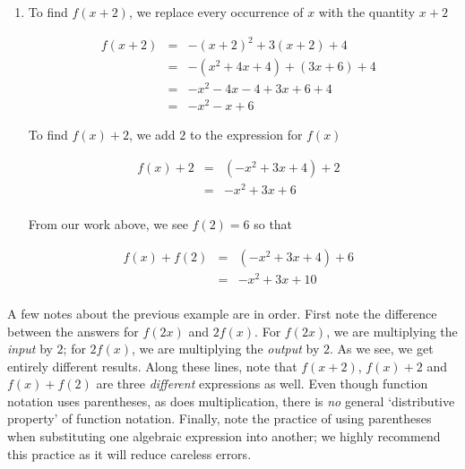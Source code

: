 \begin{solution}
\begin{enumerate}
			
			\item  To find $f(x+2)$, we replace every occurrence of $x$ with the quantity $x+2$
			
			\[ \begin{array}{rclr}  
			f(x+2) & = & -(x+2)^2 + 3(x+2) + 4 & \\
			& = & -\left(x^2 + 4x + 4\right) + (3x+6) + 4 & \\
			& = & -x^2-4x-4+3x+6+4 &  \\
			& = & -x^2-x+6 & 
			\end{array} \]
			
			To find $f(x)+2$, we add $2$ to the expression for $f(x)$
			
			\[ \begin{array}{rclr}  
			f(x) + 2 & = & \left(-x^2 + 3x + 4\right) + 2  & \\
			& = & -x^2 + 3x + 6 \\ 
			\end{array} \]
			
			From our work above, we see $f(2) = 6$ so that
			
			\[ \begin{array}{rclr}  
			f(x) + f(2) & = & \left(-x^2 + 3x + 4\right) + 6  & \\
			& = & -x^2 + 3x + 10 \\ 
			\end{array} \]
			
		\end{enumerate}
		

A few notes about the previous example are in order.  First note the difference between the answers for $f(2x)$ and $2f(x)$.  For $f(2x)$, we are multiplying the \textit{input} by $2$;  for $2 f(x)$, we are multiplying the \textit{output} by $2$.  As we see, we get entirely different results.  Along these lines, note that $f(x+2)$, $f(x) + 2$ and $f(x) + f(2)$ are three \textit{different} expressions as well.  Even though function notation uses parentheses, as does multiplication, there is \textit{no} general `distributive property' of function notation. Finally, note the practice of using parentheses when substituting one algebraic expression into another;  we highly recommend this practice as it will reduce careless errors. 
\end{solution}


